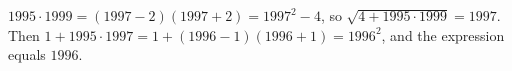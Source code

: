 $1995\cdot1999=(1997-2)(1997+2)=1997^2-4$, so $\sqrt{4+1995\cdot1999}=1997$. Then $1+1995\cdot1997=1+(1996-1)(1996+1)=1996^2$, and the expression equals $\boxed{1996}$.
